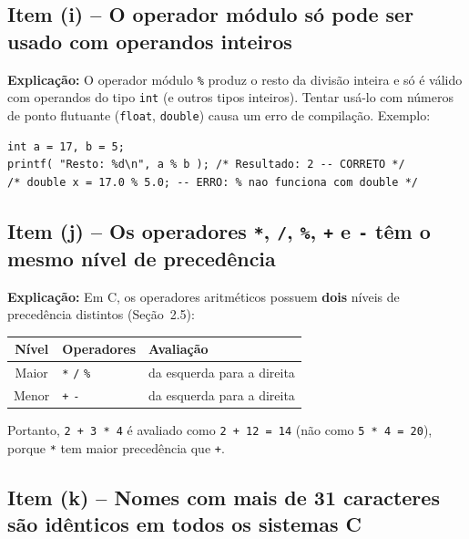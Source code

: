 \documentclass[12pt,a4paper]{article}
\begin{document}
\subsection*{Item (i) -- O operador módulo só pode ser usado com operandos inteiros}

\begin{tcolorbox}[colback=green!5,colframe=deitelgreen,title={\bfseries VERDADEIRO}]
\textbf{Explicação:} O operador módulo \texttt{\%} produz o resto da divisão inteira e
só é válido com operandos do tipo \texttt{int} (e outros tipos inteiros). Tentar usá-lo
com números de ponto flutuante (\texttt{float}, \texttt{double}) causa um erro de
compilação. Exemplo:
\begin{lstlisting}
int a = 17, b = 5;
printf( "Resto: %d\n", a % b ); /* Resultado: 2 -- CORRETO */
/* double x = 17.0 % 5.0; -- ERRO: % nao funciona com double */
\end{lstlisting}
\end{tcolorbox}

\subsection*{Item (j) -- Os operadores \texttt{*}, \texttt{/}, \texttt{\%}, \texttt{+} e \texttt{-} têm o mesmo nível de precedência}

\begin{tcolorbox}[colback=red!5,colframe=deitelred,title={\bfseries FALSO}]
\textbf{Explicação:} Em C, os operadores aritméticos possuem \textbf{dois} níveis de
precedência distintos (Seção~2.5):

\begin{center}
\renewcommand{\arraystretch}{1.4}
\begin{tabular}{c l l}
  \toprule \textbf{Nível} & \textbf{Operadores} & \textbf{Avaliação} \\ \midrule
  Maior & \texttt{*} \quad \texttt{/} \quad \texttt{\%} & da esquerda para a direita \\
  Menor & \texttt{+} \quad \texttt{-} & da esquerda para a direita \\ \bottomrule
\end{tabular}
\end{center}

Portanto, \texttt{2 + 3 * 4} é avaliado como \texttt{2 + 12 = 14} (não como \texttt{5 * 4 = 20}),
porque \texttt{*} tem maior precedência que \texttt{+}.
\end{tcolorbox}

\subsection*{Item (k) -- Nomes com mais de 31 caracteres são idênticos em todos os sistemas C}
\end{document}
